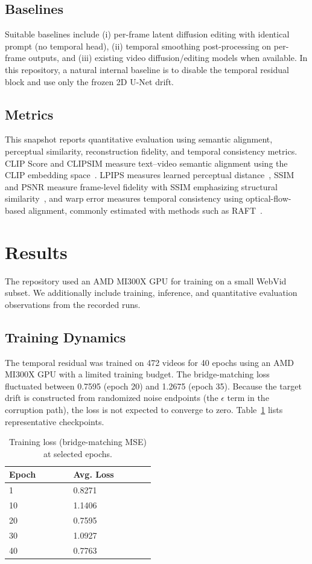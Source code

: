 \documentclass[journal]{IEEEtran}
\begin{document}
\subsection{Baselines}
Suitable baselines include (i) per-frame latent diffusion editing with identical prompt (no temporal head), (ii) temporal smoothing post-processing on per-frame outputs, and (iii) existing video diffusion/editing models when available. In this repository, a natural internal baseline is to disable the temporal residual block and use only the frozen 2D U-Net drift.

\subsection{Metrics}
This snapshot reports quantitative evaluation using semantic alignment, perceptual similarity, reconstruction fidelity, and temporal consistency metrics. CLIP Score and CLIPSIM measure text--video semantic alignment using the CLIP embedding space~\cite{radford2021clip}. LPIPS measures learned perceptual distance~\cite{zhang2018lpips}, SSIM and PSNR measure frame-level fidelity with SSIM emphasizing structural similarity~\cite{wang2004ssim}, and warp error measures temporal consistency using optical-flow-based alignment, commonly estimated with methods such as RAFT~\cite{teed2020raft}.

\section{Results}
The repository used an AMD MI300X GPU for training on a small WebVid subset. We additionally include training, inference, and quantitative evaluation observations from the recorded runs.

\subsection{Training Dynamics}
The temporal residual was trained on 472 videos for 40 epochs using an AMD MI300X GPU with a limited training budget. The bridge-matching loss fluctuated between 0.7595 (epoch 20) and 1.2675 (epoch 35). Because the target drift is constructed from randomized noise endpoints (the $\epsilon$ term in the corruption path), the loss is not expected to converge to zero. Table~\ref{tab:train_loss} lists representative checkpoints.

\begin{table}[t]
\caption{Training loss (bridge-matching MSE) at selected epochs.}
\label{tab:train_loss}
\centering
\begin{tabular}{@{}p{0.20\linewidth}p{0.28\linewidth}@{}}
\toprule
\textbf{Epoch} & \textbf{Avg. Loss} \\
\midrule
1 & 0.8271 \\
10 & 1.1406 \\
20 & 0.7595 \\
30 & 1.0927 \\
40 & 0.7763 \\
\bottomrule
\end{tabular}
\end{table}
\end{document}

